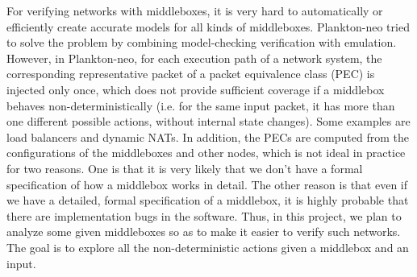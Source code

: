 For verifying networks with middleboxes, it is very hard to automatically or
efficiently create accurate models for all kinds of middleboxes. Plankton-neo
\cite{2018-PrabhuEtAl} tried to solve the problem by combining model-checking
verification with emulation. However, in Plankton-neo, for each execution path
of a network system, the corresponding representative packet of a packet
equivalence class (PEC) is injected only once, which does not provide sufficient
coverage if a middlebox behaves non-deterministically (i.e. for the same input
packet, it has more than one different possible actions, without internal state
changes). Some examples are load balancers and dynamic NATs. In addition, the
PECs are computed from the configurations of the middleboxes and other nodes,
which is not ideal in practice for two reasons. One is that it is very likely
that we don't have a formal specification of how a middlebox works in detail.
The other reason is that even if we have a detailed, formal specification of a
middlebox, it is highly probable that there are implementation bugs in the
software.
Thus, in this project, we plan to analyze some given middleboxes so as to make
it easier to verify such networks. The goal is to explore all the non-deterministic
actions given a middlebox and an input.


